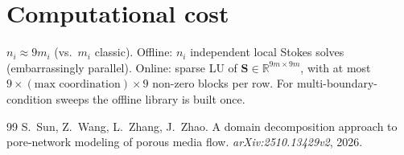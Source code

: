 \documentclass[11pt,a4paper]{article}
\newcommand{\R}{\mathbb{R}}
\newcommand{\Schur}{\mathbf{S}}
\begin{document}
\section{Computational cost}
\label{sec:cost}

$n_i \approx 9m_i$ (vs.\ $m_i$ classic).  Offline: $n_i$ independent
local Stokes solves (embarrassingly parallel).  Online: sparse LU of
$\Schur \in \R^{9m\times 9m}$, with at most
$9 \times (\text{max coordination}) \times 9$ non-zero blocks per row.
For multi-boundary-condition sweeps the offline library is built once.

\begin{thebibliography}{99}
S.~Sun, Z.~Wang, L.~Zhang, J.~Zhao.
\newblock A domain decomposition approach to pore-network modeling of porous
  media flow.
\newblock \textit{arXiv:2510.13429v2}, 2026.
\end{thebibliography}
\end{document}
